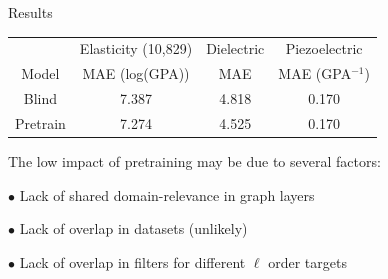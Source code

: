 \documentclass[11pt]{beamer}
\begin{document}
\begin{frame}{Results}

\begin{tabular}{c|ccc}
& Elasticity (10,829)& Dielectric & Piezoelectric\\
Model & MAE (log(GPA)) & MAE  & MAE (GPA$^{-1}$) \\
\hline
Blind & 7.387 & 4.818 & 0.170\\
Pretrain & 7.274 &4.525 &0.170\\
\end{tabular}

\vspace{0.8cm}

The low impact of pretraining may be due to several factors:

\medskip

$\bullet$ Lack of shared domain-relevance in graph layers

$\bullet$ Lack of overlap in datasets (unlikely)

$\bullet$ Lack of overlap in filters for different $\ell$ order targets

\end{frame}
\end{document}
